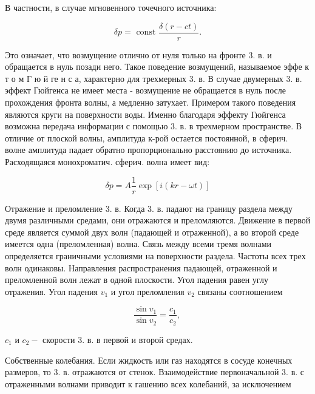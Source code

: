 \documentclass[10pt]{article}
\begin{document}
В частности, в случае мгновенного точечного источника:



\[

\delta p=\text { const } \frac{\delta(r-c t)}{r} .

\]



Это означает, что возмущение отлично от нуля только на фронте 3. в. и обращается в нуль позади него. Такое поведение возмущений, называемое эффе к т о м Г ю й ге н с а, характерно для трехмерных 3. в. В случае двумерных 3. в. эффект Гюйгенса не имеет места - возмущение не обращается в нуль после прохождения фронта волны, а медленно затухает. Примером такого поведения являются круги на поверхности воды. Именно благодаря эффекту Гюйгенса возможна передача информации с помощью 3. в. в трехмерном пространстве. В отличие от плоской волны, амплитуда к-рой остается постоянной, в сферич. волне амплитуда падает обратно пропорционально расстоянию до источника. Расходящаяся монохроматич. сферич. волна имеет вид:



\[

\delta p=A \frac{1}{r} \exp [i(k r-\omega t)]

\]



Отражение и преломление 3. в. Когда 3. в. падают на границу раздела между двумя различными средами, они отражаются и преломляются. Движение в первой среде является суммой двух волн (падающей и отраженной), а во второй среде имеется одна (преломленная) волна. Связь между всеми тремя волнами определяется граничными условиями на поверхности раздела. Частоты всех трех волн одинаковы. Направления распространения падающей, отраженной и преломленной волн лежат в одной плоскости. Угол падения равен углу отражения. Угол падения $v_{1}$ и угол преломления $v_{2}$ связаны соотношением



\[

\frac{\sin v_{1}}{\sin v_{2}}=\frac{c_{1}}{c_{2}} \text {, }

\]



$c_{1}$ и $c_{2}-$ скорости 3. в. в первой и второй средах.



Собственные колебания. Если жидкость или газ находятся в сосуде конечных размеров, то 3. в. отражаются от стенок. Взаимодействие первоначальной 3. в. с отраженными волнами приводит к гашению всех колебаний, за исключением
\end{document}

